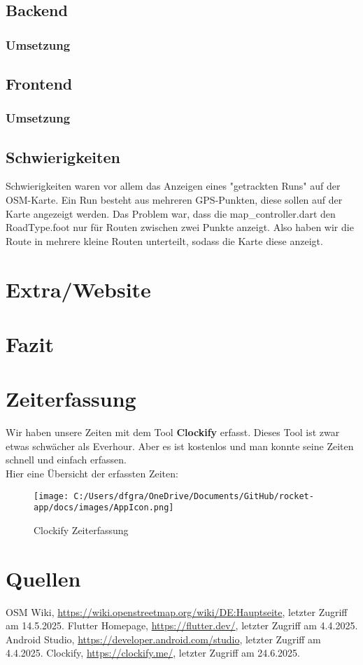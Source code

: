 \documentclass[11pt,a4paper]{article}
\begin{document}
\subsection{Backend}
\subsubsection{Umsetzung}
\subsection{Frontend}
\subsubsection{Umsetzung}
\subsection{Schwierigkeiten}
Schwierigkeiten waren vor allem das Anzeigen eines "getrackten Runs" auf der OSM-Karte. Ein Run besteht aus mehreren GPS-Punkten, diese sollen auf der Karte angezeigt werden.
Das Problem war, dass die map_controller.dart den RoadType.foot nur für Routen zwischen zwei Punkte anzeigt. Also haben wir die Route in mehrere kleine Routen unterteilt, sodass die Karte diese anzeigt.\\
\section{Extra/Website}
\section{Fazit}
\section{Zeiterfassung}
Wir haben unsere Zeiten mit dem Tool \textbf{Clockify} erfasst. Dieses Tool ist zwar etwas schwächer als Everhour. Aber es ist kostenlos und man konnte seine Zeiten schnell und einfach erfassen.\\
Hier eine Übersicht der erfassten Zeiten:
\begin{figure}[h]
    \centering
    \texttt{[image: C:/Users/dfgra/OneDrive/Documents/GitHub/rocket-app/docs/images/AppIcon.png]}
    \caption{Clockify Zeiterfassung}
    \label{fig:clockify}
\end{figure}
\section{Quellen}
\begin{thebibliography}{8}
    OSM Wiki, \url{https://wiki.openstreetmap.org/wiki/DE:Hauptseite}, letzter Zugriff am 14.5.2025.
    Flutter Homepage, \url{https://flutter.dev/}, letzter Zugriff am 4.4.2025.
    Android Studio, \url{https://developer.android.com/studio}, letzter Zugriff am 4.4.2025.
    Clockify, \url{https://clockify.me/}, letzter Zugriff am 24.6.2025.
\end{thebibliography}
\end{document}
